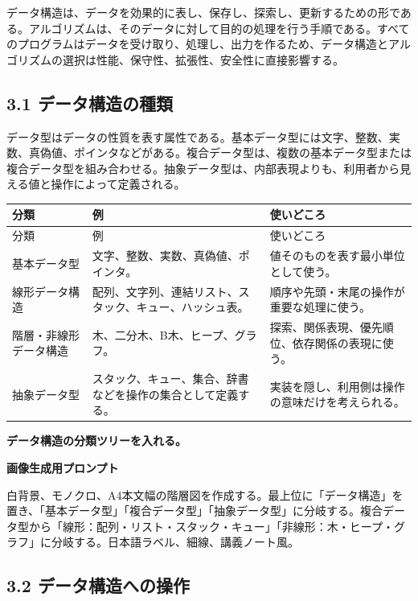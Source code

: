 \documentclass[a4paper,11pt]{ltjsarticle}
\begin{document}
データ構造は、データを効果的に表し、保存し、探索し、更新するための形である。アルゴリズムは、そのデータに対して目的の処理を行う手順である。すべてのプログラムはデータを受け取り、処理し、出力を作るため、データ構造とアルゴリズムの選択は性能、保守性、拡張性、安全性に直接影響する。

\subsection{3.1 データ構造の種類}

データ型はデータの性質を表す属性である。基本データ型には文字、整数、実数、真偽値、ポインタなどがある。複合データ型は、複数の基本データ型または複合データ型を組み合わせる。抽象データ型は、内部表現よりも、利用者から見える値と操作によって定義される。

\begin{longtable}{>{\raggedright\arraybackslash}p{}>{\raggedright\arraybackslash}p{}>{\raggedright\arraybackslash}p{}}
\toprule
分類 & 例 & 使いどころ \\
\midrule
\endfirsthead
\toprule
分類 & 例 & 使いどころ \\
\midrule
\endhead
基本データ型 & 文字、整数、実数、真偽値、ポインタ。 & 値そのものを表す最小単位として使う。 \\
線形データ構造 & 配列、文字列、連結リスト、スタック、キュー、ハッシュ表。 & 順序や先頭・末尾の操作が重要な処理に使う。 \\
階層・非線形データ構造 & 木、二分木、B木、ヒープ、グラフ。 & 探索、関係表現、優先順位、依存関係の表現に使う。 \\
抽象データ型 & スタック、キュー、集合、辞書などを操作の集合として定義する。 & 実装を隠し、利用側は操作の意味だけを考えられる。 \\
\bottomrule
\end{longtable}

\begin{todobox}
\textbf{データ構造の分類ツリーを入れる。}\par
\textbf{画像生成用プロンプト}\par
白背景、モノクロ、A4本文幅の階層図を作成する。最上位に「データ構造」を置き、「基本データ型」「複合データ型」「抽象データ型」に分岐する。複合データ型から「線形：配列・リスト・スタック・キュー」「非線形：木・ヒープ・グラフ」に分岐する。日本語ラベル、細線、講義ノート風。

\end{todobox}

\subsection{3.2 データ構造への操作}
\end{document}
